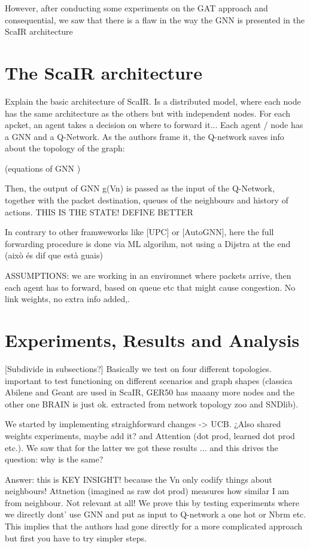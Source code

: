\documentclass[10pt,twocolumn,letterpaper]{article}
\begin{document}
However, after conducting some experiments on the GAT approach and consequential, we saw that there is a flaw in the way the GNN is presented in the ScaIR architecture



\section{The ScaIR architecture}

Explain the basic architecture of ScaIR. Is a distributed model, where each node has the same architecture as the others but with independent nodes. For each apcket, an agent takes a decision on where to forward it...
Each agent / node has a GNN and a Q-Network. As the authors frame it, the Q-network saves info about the topology of the graph:

(equations of GNN )

Then, the output of GNN g(Vn) is passed as the input of the Q-Network, together with the packet destination, queues of the neighbours and history of actions. THIS IS THE STATE! DEFINE BETTER

In contrary to other framweworks like [UPC] or [AutoGNN], here the full forwarding procedure is done via ML algorihm, not using a Dijstra at the end (això és dif que està guais)

ASSUMPTIONS: we are working in an enviromnet where packets arrive, then each agent has to forward, based on queue etc that might cause congestion. No link weights, no extra info added,.


\section{Experiments, Results and Analysis}
[Subdivide in subsections?]
Basically we test on four different topologies. important to test functioning on different scenarios and graph shapes (classica Abilene and Geant are used in ScaIR, GER50 has maaany more nodes and the other one BRAIN is just ok. extracted from network topology zoo and SNDlib).

We started by implementing straighforward changes -> UCB. ¿Also shared weights experiments, maybe add it? and Attention (dot prod, learned dot prod etc.). We saw that for the latter we got these results ... and this drives the question: why is the same?

Answer: this is KEY INSIGHT! because the Vn only codify things about neighbours! Attnetion (imagined as raw dot prod) measures how similar I am from neighbour. Not relevant at all! We prove this by testing experiments where we directly dont' use GNN and put as input to Q-network a one hot or Nbrm etc. This implies that the authors had gone directly for a more complicated approach but first you have to try simpler steps.
\end{document}

